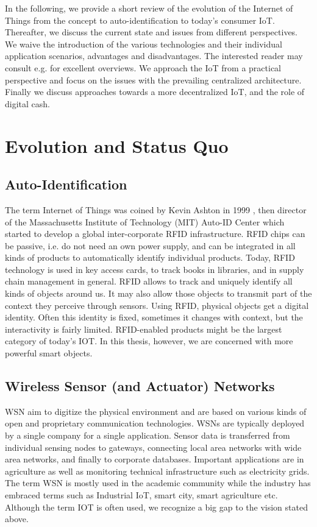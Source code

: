In the following, we provide a short review of the evolution of the Internet of Things from the concept to auto-identification to today's consumer IoT. Thereafter, we discuss the current state and issues from different perspectives. We waive the introduction of the various technologies and their individual application scenarios, advantages and disadvantages. The interested reader may consult e.g. \parencite{Atzori20102787,Mattern2010,Gubbi20131645} for excellent overviews. We approach the IoT from a practical perspective and focus on the issues with the prevailing centralized architecture. Finally we discuss approaches towards a more decentralized IoT, and the role of digital cash.

\section{Evolution and Status Quo}

\subsection{Auto-Identification}

The term Internet of Things was coined by Kevin Ashton in 1999 \parencite[c.f ][]{ashton2009internet}, then director of the Massachusetts Institute of Technology (MIT) Auto-ID Center which started to develop a global inter-corporate \ac{RFID} infrastructure. \ac{RFID} chips can be passive, i.e. do not need an own power supply, and can be integrated in all kinds of products to automatically identify individual products. Today, \ac{RFID} technology is used in key access cards, to track books in libraries, and in supply chain management in general. \ac{RFID} allows to track and uniquely identify all kinds of objects around us. It may also allow those objects to transmit part of the context they perceive through sensors. Using \ac{RFID}, physical objects get a digital identity. Often this identity is fixed, sometimes it changes with context, but the interactivity is fairly limited. \ac{RFID}-enabled products might be the largest category of today's \ac{IOT}. In this thesis, however, we are concerned with more powerful smart objects.  

\subsection{Wireless Sensor (and Actuator) Networks}

\ac{WSN} aim to digitize the physical environment and are based on various kinds of open and proprietary communication technologies. \ac{WSN}s are typically deployed by a single company for a single application. Sensor data is transferred from individual sensing nodes to gateways, connecting local area networks with wide area networks, and finally to corporate databases. Important applications are in agriculture as well as monitoring technical infrastructure such as electricity grids. The term \ac{WSN} is mostly used in the academic community while the industry has embraced terms such as Industrial IoT, smart city, smart agriculture etc. Although the term \ac{IOT} is often used, we recognize a big gap to the vision stated above.

